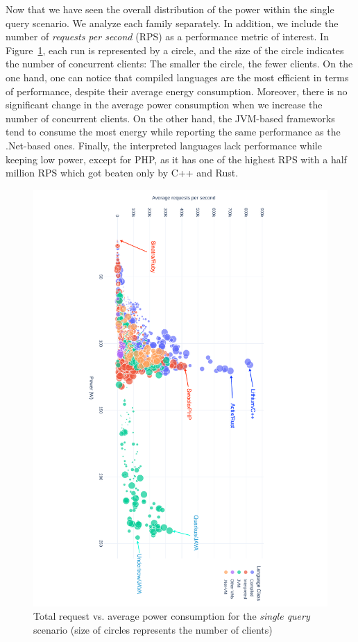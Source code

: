 Now that we have seen the overall distribution of the power within the single query scenario.
We analyze each family separately.
In addition, we include the number of \emph{requests per second} (RPS) as a performance metric of interest.
In Figure~\ref{fig:power_requests_db}, each run is represented by a circle, and the size of the circle indicates the number of concurrent clients: The smaller the circle, the fewer clients.
On the one hand, one can notice that compiled languages are the most efficient in terms of performance, despite their average energy consumption.
Moreover, there is no significant change in the average power consumption when we increase the number of concurrent clients.
On the other hand, the JVM-based frameworks tend to consume the most energy while reporting the same performance as the .Net-based ones.
Finally, the interpreted languages lack performance while keeping low power, except for PHP, as it has one of the highest RPS with a half million RPS which got beaten only by C++ and Rust.

\begin{figure}[!h]
    \includegraphics[height=\textwidth,width=\textheight,keepaspectratio,angle=90]{imgs/power_requests_db}
    \caption{Total request vs. average power consumption for the \emph{single query} scenario (size of circles represents the number of clients)}
    \label{fig:power_requests_db}
\end{figure}

